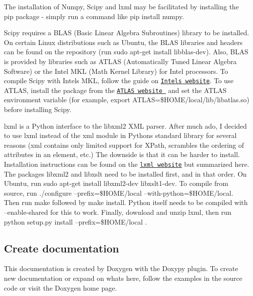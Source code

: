 \begin{DoxyItemize}
\item The installation of Numpy, Scipy and lxml may be facilitated by installing the {\ttfamily pip} package -\/ simply run a command like {\ttfamily pip install numpy}. \item Scipy requires a B\+L\+AS (Basic Linear Algebra Subroutines) library to be installed. On certain Linux distributions such as Ubuntu, the B\+L\+AS libraries and headers can be found on the repository (run {\ttfamily sudo apt-\/get install libblas-\/dev}). Also, B\+L\+AS is provided by libraries such as A\+T\+L\+AS (Automatically Tuned Linear Algebra Software) or the Intel M\+KL (Math Kernel Library) for Intel processors. To compile Scipy with Intel\textquotesingle{}s M\+KL, follow the guide on \href{http://software.intel.com/en-us/articles/numpy-scipy-with-mkl}{\tt Intel\textquotesingle{}s website}. To use A\+T\+L\+AS, install the package from the \href{http://math-atlas.sourceforge.net}{\tt A\+T\+L\+AS website } and set the A\+T\+L\+AS environment variable (for example, {\ttfamily export A\+T\+L\+AS=\$\+H\+O\+ME/local/lib/libatlas.so}) before installing Scipy. \item {\ttfamily lxml} is a Python interface to the libxml2 X\+ML parser. After much ado, I decided to use {\ttfamily lxml} instead of the {\ttfamily xml} module in Python\textquotesingle{}s standard library for several reasons ({\ttfamily xml} contains only limited support for X\+Path, scrambles the ordering of attributes in an element, etc.) The downside is that it can be harder to install. Installation instructions can be found on the \href{http://lxml.de/installation.html}{\tt lxml website} but summarized here. The packages {\ttfamily libxml2} and {\ttfamily libxslt} need to be installed first, and in that order. On Ubuntu, run {\ttfamily sudo apt-\/get install libxml2-\/dev libxslt1-\/dev}. To compile from source, run {\ttfamily ./configure --prefix=\$\+H\+O\+ME/local --with-\/python=\$\+H\+O\+ME/local}. Then run {\ttfamily make} followed by {\ttfamily make install}. Python itself needs to be compiled with {\ttfamily --enable-\/shared} for this to work. Finally, download and unzip {\ttfamily lxml}, then run {\ttfamily  python setup.\+py install --prefix=\$\+H\+O\+ME/local }.\end{DoxyItemize}
\hypertarget{installation_create_doc}{}\subsection{Create documentation}\label{installation_create_doc}
This documentation is created by Doxygen with the Doxypy plugin. To create new documentation or expand on what\textquotesingle{}s here, follow the examples in the source code or visit the Doxygen home page.

